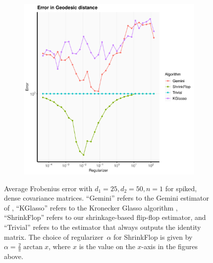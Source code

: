 \documentclass[aos]{imsart}
\theoremstyle{definition}
\numberwithin{equation}{section}
\begin{document}
\begin{figure}
\begin{subfigure}[b]{.4\textwidth}
          \includegraphics[width=\textwidth]{./code/zhou-comparison/25-50-spiked-geo.pdf}
          \end{subfigure}
\caption{Average Frobenius error with $d_1 = 25, d_2 = 50, n = 1$ for spiked, dense covariance matrices. ``Gemini'' refers to the Gemini estimator of \cite{zhou2014gemini}, ``KGlasso'' refers to the Kronecker Glasso algorithm \cite{tsiligkaridis2013convergence}, ``ShrinkFlop'' refers to our shrinkage-based flip-flop estimator, and ``Trivial'' refers to the estimator that always outputs the identity matrix. The choice of regularizer~$\alpha$ for ShrinkFlop is given by $\alpha = \frac{2}{\pi} \arctan{x}$, where $x$ is the value on the $x$-axis in the figures above. }\label{fig:spiked}
\end{figure}

\end{document}
